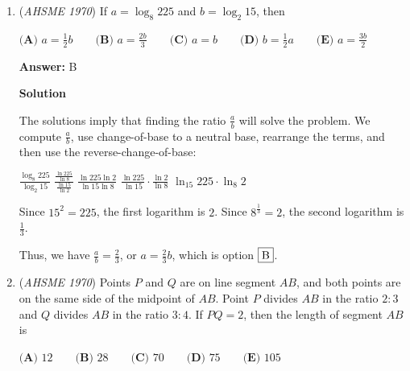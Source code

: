 \begin{enumerate}
 The circle centered at $A$ with radius $1$ is $x^2 + y^2 = 1$.  The circle centered at $B$ with radius $1$ is $(x - 1)^2 + y^2 = 1$.  Solving each equation for $1 - y^2$ to find the intersection leads to $(x - 1)^2 = x^2$, which leads to $x = \frac{1}{2}$.

 Plugging that back in to $x^2 + y^2 = 1$ leads to $y^2 = 1 - \frac{1}{4}$, or $y = \pm \frac{\sqrt{3}}{2}$.  Since we want the intersection within the square where $0 < x, y < 1$, we take the positive solution, and the intersection is at $X(\frac{1}{2}, \frac{\sqrt{3}}{2})$.

 The distance from $X$ to side $CD$, which lies along the line $y=1$, is $1 - \frac{\sqrt{3}}{2}$, or $\frac{2  -\sqrt{3}}{2}$.  This is answer $\fbox{E}$ when $s=1$.

 


	\item (\textit{AHSME 1970}) If $a=\log_8{225}$ and $b=\log_2{15}$, then


 $\textbf{(A) }a=\frac{1}{2}b\qquad \textbf{(B) }a=\frac{2b}{3}\qquad \textbf{(C) }a=b\qquad \textbf{(D) }b=\frac{1}{2}a\qquad \textbf{(E) }a=\frac{3b}{2}$

 \textbf{Answer: }B



\textbf{Solution}

The solutions imply that finding the ratio $\frac{a}{b}$ will solve the problem.  We compute $\frac{a}{b}$, use change-of-base to a neutral base, rearrange the terms, and then use the reverse-change-of-base:

 $\frac{\log_8 225}{\log_2 15}$
$\frac{\frac{\ln 225}{\ln 8}}{\frac{\ln 15}{\ln 2}}$
$\frac{\ln 225 \ln 2}{\ln 15 \ln 8}$
$\frac{\ln 225}{\ln 15} \cdot \frac{\ln 2}{\ln 8}$
$\ln_{15} 225 \cdot \ln_8 2$

 Since $15^2 = 225$, the first logarithm is $2$.  Since $8^{\frac{1}{3}} = 2$, the second logarithm is $\frac{1}{3}$.

 Thus, we have $\frac{a}{b} = \frac{2}{3}$, or $a = \frac{2}{3}b$, which is option $\fbox{B}$.

 


	\item (\textit{AHSME 1970}) Points $P$ and $Q$ are on line segment $AB$, and both points are on the same side of the midpoint of $AB$.
Point $P$ divides $AB$ in the ratio $2:3$ and $Q$ divides $AB$ in the ratio $3:4$. If $PQ=2$, then the length of segment $AB$ is


 $\textbf{(A) }12\qquad \textbf{(B) }28\qquad \textbf{(C) }70\qquad \textbf{(D) }75\qquad  \textbf{(E) }105$


\end{enumerate}
